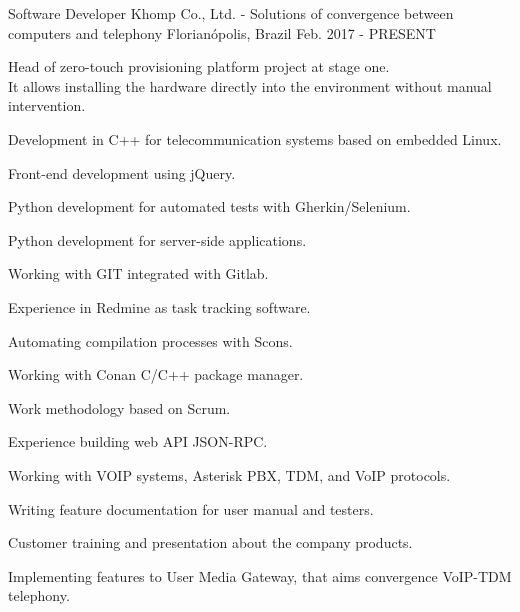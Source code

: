 

\begin{cventries}

  \cventry
    {Software Developer} %
    {Khomp Co., Ltd. - Solutions of convergence between computers and telephony} %
    {Florianópolis, Brazil} %
    {Feb. 2017 - PRESENT} %
    {
      \begin{cvitems} %
        \item {Head of zero-touch provisioning platform project at stage one. \\
	It allows installing the hardware directly into the environment without manual intervention.}
        \item {Development in C++ for telecommunication systems based on embedded Linux.}
        \item {Front-end development using jQuery.}
        \item {Python development for automated tests with Gherkin/Selenium.}
        \item {Python development for server-side applications.}
        \item {Working with GIT integrated with Gitlab.}
        \item {Experience in Redmine as task tracking software.}
        \item {Automating compilation processes with Scons.}
        \item {Working with Conan C/C++ package manager.}
        \item {Work methodology based on Scrum.}
        \item {Experience building web API JSON-RPC.}
        \item {Working with VOIP systems, Asterisk PBX, TDM, and VoIP protocols.}
        \item {Writing feature documentation for user manual and testers.}
        \item {Customer training and presentation about the company products.}
        \item {Implementing features to User Media Gateway, that aims convergence VoIP-TDM telephony.}
      \end{cvitems}
    }


\end{cventries}

